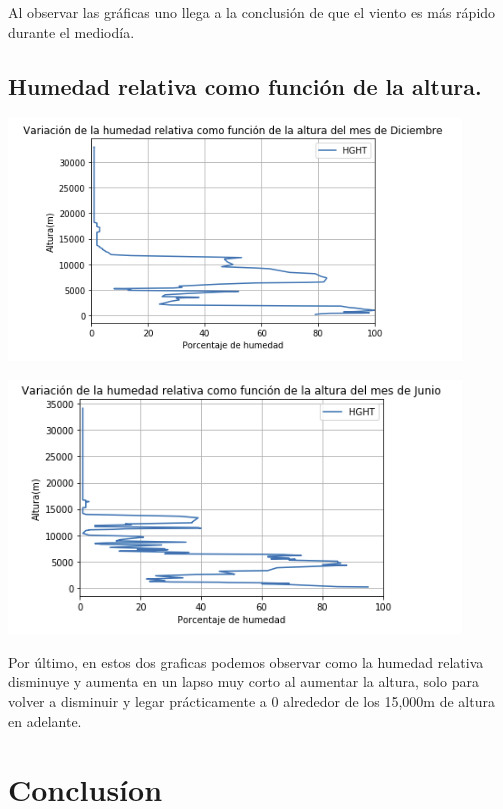 \documentclass{article}
\begin{document}
Al observar las gráficas uno llega a la conclusión de que el viento es más rápido durante el mediodía.

\subsection{Humedad relativa como función de la altura.}

\begin{center}
	\includegraphics[width=12cm]{graph5D.png}
\end{center}

\begin{center}
	\includegraphics[width=12cm]{graph5J.png}
\end{center}
\vspace{0.3cm}

Por último, en estos dos graficas podemos observar como la humedad relativa disminuye y aumenta en un lapso muy corto al aumentar la altura, solo para volver a disminuir y legar prácticamente a 0 alrededor de los 15,000m de altura en adelante.

\section{Conclusíon}
\end{document}
